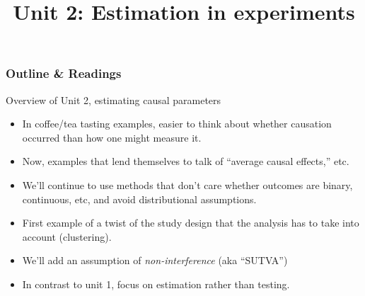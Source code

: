 

%

%

%





\title{Unit 2: Estimation in experiments}




  \begin{frame}
    \frametitle{Outline \& Readings}

\tableofcontents[subsectionstyle=show/hide/hide]

\end{frame}






\begin{frame}{Overview of Unit 2, estimating causal parameters}
  \begin{itemize}
  \item In coffee/tea tasting examples, easier to think about whether causation occurred than how one might measure it.
  \item Now, examples that lend themselves to talk of ``average causal effects,'' etc.
  \item We'll continue to use methods that don't care whether outcomes
    are binary, continuous, etc, and avoid distributional assumptions.
  \item  First example of a  twist of the study design that the
    analysis has to take into account (clustering).   
  \item We'll add an assumption of \textit{non-interference} (aka ``SUTVA'')
  \item In contrast to unit 1, focus on estimation rather than testing.
  \end{itemize}
\end{frame}


